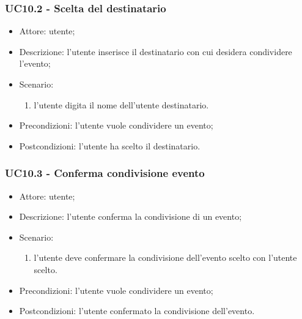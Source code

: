 \subsubsection{UC10.2 - Scelta del destinatario} \label{sec: UC10.2}
\begin{itemize}
    \item Attore: utente;
    \item Descrizione: l'utente inserisce il destinatario con cui desidera condividere l'evento;
    \item Scenario:
        \begin{enumerate}
        \item l'utente digita il nome dell'utente destinatario.
        \end{enumerate}
    
    \item Precondizioni: l'utente vuole condividere un evento;
    \item Postcondizioni: l'utente ha scelto il destinatario.
\end{itemize}


\subsubsection{UC10.3 - Conferma condivisione evento} \label{sec: UC10.3}
\begin{itemize}
    \item Attore: utente;
    \item Descrizione: l'utente conferma la condivisione di un evento;
    \item Scenario:
        \begin{enumerate}
        \item l'utente deve confermare la condivisione dell'evento scelto con l'utente scelto.
        \end{enumerate}
    
    \item Precondizioni: l'utente vuole condividere un evento;
    \item Postcondizioni: l'utente confermato la condivisione dell'evento.
\end{itemize}

